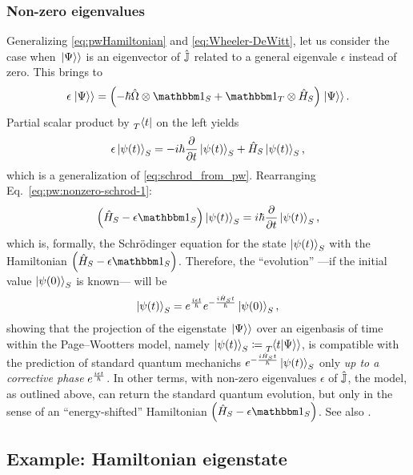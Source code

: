 \subsubsection{Non-zero eigenvalues}
Generalizing \eqref{eq:pwHamiltonian} and \eqref{eq:Wheeler-DeWitt}, let us consider the case when
$\left.\left| \Psi \right\rangle\right\rangle$ is an eigenvector of $\hat{\mathbb{J}}$ related to a general eigenvale $\epsilon$
instead of zero. This brings to
\begin{equation}\label{eq:pw:non0e:first}
  \epsilon \dket{\Psi} = \qty(-\hbar\op{\Omega} \ox \idop_S + \idop_T \ox \op{H}_S) \dket{\Psi} \text{.}
\end{equation}
Partial scalar product by $\prescript{}{T}{\bra{t}}$ on the left yields
\begin{equation}\label{eq:pw:nonzero-schrod-1}
  \epsilon\ket{\psi(t)}_{S} = -i\hbar\pdv{t}\ket{\psi(t)}_{S} + \hat{H}_S\ket{\psi(t)}_{S}
  \text{,}
\end{equation}
which is a generalization of \eqref{eq:schrod_from_pw}.
Rearranging Eq.~\eqref{eq:pw:nonzero-schrod-1}:
\begin{equation}\label{eq:pw:nonzero-schrod-2}
   \qty(\op{H}_S - \epsilon \idop_{S}) \ket{\psi(t)}_{S} = i\hbar\pdv{t}\ket{\psi(t)}_{S}
   \text{,}
\end{equation}
which is, formally, the Schr\"{o}dinger equation
for the state $\ket{\psi(t)}_{S}$ with
the Hamiltonian $\qty(\op{H}_S - \epsilon \idop_{S})$.
Therefore, the ``evolution''
---if the initial value $\ket{\psi(0)}_S$ is known---
will be
\begin{equation}\label{eq:pw:non0e:last}
  \ket{\psi(t)}_S = e^{\frac{i \epsilon t}{\hbar}} e^{-\frac{i \hat{H}_{S} t}{\hbar}} \ket{\psi(0)}_S
  \text{,}
\end{equation}
showing that the projection of the eigenstate $\left.\left| \Psi \right\rangle\right\rangle$ over an eigenbasis of time within the Page--Wootters model,
namely $\ket{\psi(t)}_S \coloneqq \prescript{}{T}{\!\left.\left\langle t \middle| \Psi \right\rangle\right\rangle}$,
is compatible with the prediction of standard quantum mechanichs $e^{-\frac{i \hat{H}_{S} t}{\hbar}} \ket{\psi(t)}_S$
only \emph{up to a corrective phase} $e^{\frac{i \epsilon t}{\hbar}}$.
In other terms, with non-zero eigenvalues $\epsilon$ of $\hat{\mathbb{J}}$,
the model, as outlined above, can return the standard quantum evolution, but
only in the sense of
an ``energy-shifted'' Hamiltonian $\qty(\op{H}_S - \epsilon \idop_{S})$.
See also \cite[\it ``The Zero-eigenvalue'']{Lloyd:Time}.

\subsection{Example: Hamiltonian eigenstate}\label{sec:pw:ex-hamiltonian-eigenstate}

